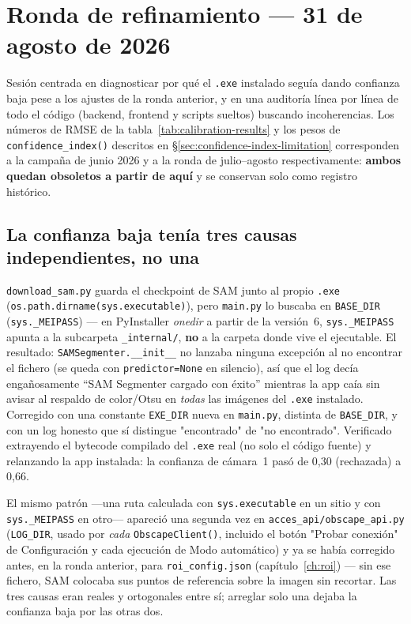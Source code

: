 \section{Ronda de refinamiento --- 31 de agosto de 2026}
\label{sec:refinamiento-agosto31}

Sesión centrada en diagnosticar por qué el \texttt{.exe} instalado seguía dando confianza baja
pese a los ajustes de la ronda anterior, y en una auditoría línea por línea de todo el código
(backend, frontend y scripts sueltos) buscando incoherencias. Los números de RMSE de la
tabla~\ref{tab:calibration-results} y los pesos de \texttt{confidence\_index()} descritos en
\S\ref{sec:confidence-index-limitation} corresponden a la campaña de junio 2026 y a la ronda de
julio--agosto respectivamente: \textbf{ambos quedan obsoletos a partir de aquí} y se conservan
solo como registro histórico.

\subsection{La confianza baja tenía tres causas independientes, no una}

\begin{warnbox}
\texttt{download\_sam.py} guarda el checkpoint de SAM junto al propio \texttt{.exe}
(\texttt{os.path.dirname(sys.executable)}), pero \texttt{main.py} lo buscaba en
\texttt{BASE\_DIR} (\texttt{sys.\_MEIPASS}) — en PyInstaller \emph{onedir} a partir de la
versión~6, \texttt{sys.\_MEIPASS} apunta a la subcarpeta \texttt{\_internal/}, \textbf{no} a la
carpeta donde vive el ejecutable. El resultado: \texttt{SAMSegmenter.\_\_init\_\_} no lanzaba
ninguna excepción al no encontrar el fichero (se queda con \texttt{predictor=None} en
silencio), así que el log decía enga\~nosamente ``SAM Segmenter cargado con éxito'' mientras la
app caía sin avisar al respaldo de color/Otsu en \emph{todas} las imágenes del \texttt{.exe}
instalado. Corregido con una constante \texttt{EXE\_DIR} nueva en \texttt{main.py}, distinta de
\texttt{BASE\_DIR}, y con un log honesto que sí distingue "encontrado" de "no encontrado".
Verificado extrayendo el bytecode compilado del \texttt{.exe} real (no solo el código fuente) y
relanzando la app instalada: la confianza de cámara~1 pasó de 0,30 (rechazada) a 0,66.
\end{warnbox}

El mismo patrón —una ruta calculada con \texttt{sys.executable} en un sitio y con
\texttt{sys.\_MEIPASS} en otro— apareció una segunda vez en \texttt{acces\_api/obscape\_api.py}
(\texttt{LOG\_DIR}, usado por \emph{cada} \texttt{ObscapeClient()}, incluido el botón "Probar
conexión" de Configuración y cada ejecución de Modo automático) y ya se había corregido antes,
en la ronda anterior, para \texttt{roi\_config.json} (capítulo~\ref{ch:roi}) — sin ese fichero,
SAM colocaba sus puntos de referencia sobre la imagen sin recortar. Las tres causas eran reales
y ortogonales entre sí; arreglar solo una dejaba la confianza baja por las otras dos.

